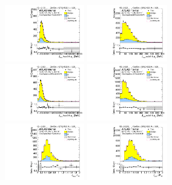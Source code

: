 \begin{figure}[htbp!]
\begin{center}
\includegraphics[width=0.31\textwidth,angle=-90]{figures/boosted/Signal/b77_TwoTag_split_Signal_leadHCand_trk0_Pt.pdf}
\includegraphics[width=0.31\textwidth,angle=-90]{figures/boosted/Signal/b77_TwoTag_split_Signal_leadHCand_trk1_Pt.pdf}\\
\includegraphics[width=0.31\textwidth,angle=-90]{figures/boosted/Signal/b77_TwoTag_split_Signal_sublHCand_trk0_Pt.pdf}
\includegraphics[width=0.31\textwidth,angle=-90]{figures/boosted/Signal/b77_TwoTag_split_Signal_sublHCand_trk1_Pt.pdf}\\
\includegraphics[width=0.31\textwidth,angle=-90]{figures/boosted/Signal/b77_TwoTag_split_Signal_leadHCand_trk_dr.pdf}
\includegraphics[width=0.31\textwidth,angle=-90]{figures/boosted/Signal/b77_TwoTag_split_Signal_sublHCand_trk_dr.pdf}

\end{center}
\end{figure}
